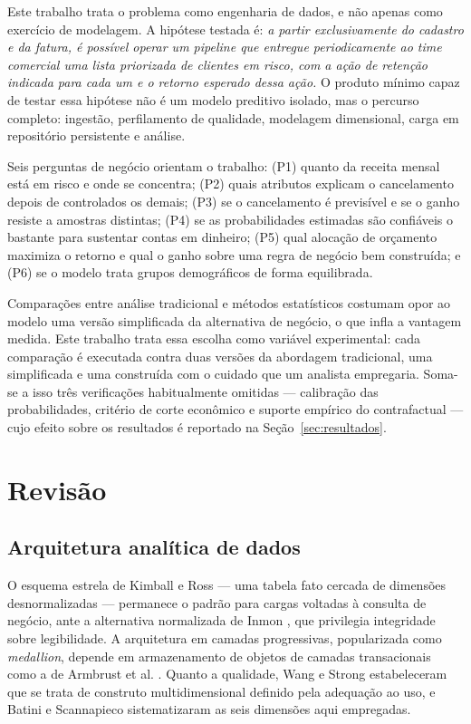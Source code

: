 \documentclass[10pt,a4paper]{article}
\begin{document}
Este trabalho trata o problema como engenharia de dados, e não apenas como exercício de
modelagem. A hipótese testada é: \emph{a partir exclusivamente do cadastro e da fatura, é
possível operar um pipeline que entregue periodicamente ao time comercial uma lista
priorizada de clientes em risco, com a ação de retenção indicada para cada um e o retorno
esperado dessa ação.} O produto mínimo capaz de testar essa hipótese não é um modelo
preditivo isolado, mas o percurso completo: ingestão, perfilamento de qualidade,
modelagem dimensional, carga em repositório persistente e análise.

Seis perguntas de negócio orientam o trabalho: (P1) quanto da receita mensal está em
risco e onde se concentra; (P2) quais atributos explicam o cancelamento depois de
controlados os demais; (P3) se o cancelamento é previsível e se o ganho resiste a
amostras distintas; (P4) se as probabilidades estimadas são confiáveis o bastante para
sustentar contas em dinheiro; (P5) qual alocação de orçamento maximiza o retorno e qual o
ganho sobre uma regra de negócio bem construída; e (P6) se o modelo trata grupos
demográficos de forma equilibrada.

Comparações entre análise tradicional e métodos estatísticos costumam opor ao modelo uma
versão simplificada da alternativa de negócio, o que infla a vantagem medida. Este trabalho
trata essa escolha como variável experimental: cada comparação é executada contra duas
versões da abordagem tradicional, uma simplificada e uma construída com o cuidado que um
analista empregaria. Soma-se a isso três verificações habitualmente omitidas --- calibração
das probabilidades, critério de corte econômico e suporte empírico do contrafactual --- cujo
efeito sobre os resultados é reportado na Seção~\ref{sec:resultados}.

\section{Revisão}

\subsection{Arquitetura analítica de dados}

O esquema estrela de Kimball e Ross \cite{kimball} --- uma tabela fato cercada de dimensões
desnormalizadas --- permanece o padrão para cargas voltadas à consulta de negócio, ante a
alternativa normalizada de Inmon \cite{inmon}, que privilegia integridade sobre legibilidade.
A arquitetura em camadas progressivas, popularizada como \emph{medallion}, depende em
armazenamento de objetos de camadas transacionais como a de Armbrust et al. \cite{armbrust}.
Quanto a qualidade, Wang e Strong \cite{wang} estabeleceram que se trata de construto
multidimensional definido pela adequação ao uso, e Batini e Scannapieco \cite{batini}
sistematizaram as seis dimensões aqui empregadas.
\end{document}
